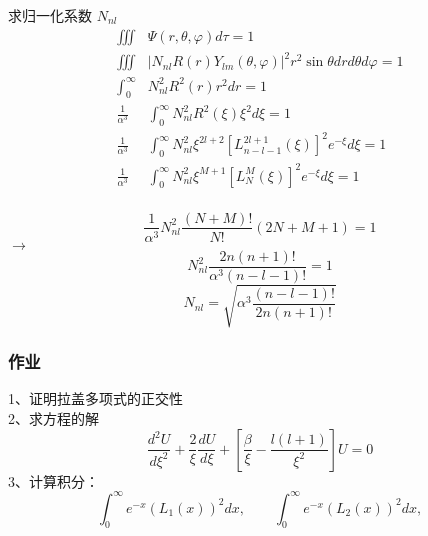 \begin{frame}
	求归一化系数 $N_{nl}$ 
	\begin{equation*}
	\begin{split}
		\iiint  &\Psi(r,\theta,\varphi) d \tau =1  \\
		\iiint  &|N_{nl} R (r) Y_{lm} (\theta,\varphi)| ^2 r^2 \sin \theta dr d\theta d\varphi =1  \\
		\int_{0}^{\infty}  & N^2_{nl} R^2  (r)  r^2 dr =1   \\
		\frac{1}{\alpha ^3}	&\int_{0}^{\infty}  N^2_{nl}  R^2 (\xi)  \xi^2 d\xi =1   \\
		\frac{1}{\alpha ^3} &	\int_{0}^{\infty}  N^2_{nl}  \xi ^{2l+2}  [L_{n-l-1} ^{2l+1} (\xi)]^2 e^{-\xi}  d\xi =1   \\
		\frac{1}{\alpha ^3} &	\int_{0}^{\infty}  N^2_{nl}  \xi ^{M+1}  [L_N ^M (\xi)]^2 e^{-\xi}  d\xi =1   \\
	\end{split}		
	\end{equation*}	
\end{frame}		

\begin{frame}
	\begin{equation*}
		\frac{1}{\alpha ^3} 	  N^2_{nl}  \frac{(N+M)!}{N!} (2N+M+1) =1  	
	\end{equation*}	
	$\to$ \\
	\begin{equation*}
		N^2 _{nl}  \frac{2n (n+1)!} {\alpha^3 (n-l-1)!} =1
	\end{equation*}	
	\begin{equation*}
		N_{nl}  =\sqrt{\alpha^3 \frac{ (n-l-1)!}{2n (n+1)!}} 
	\end{equation*}	
\end{frame}		

\begin{frame}
	\frametitle{作业}
	1、证明拉盖多项式的正交性\\
	2、求方程的解
	\begin{equation*}
		\frac{d^2 U}{d \xi ^2} + \frac{2}{\xi }\frac{d U }{d \xi}  +[\frac{\beta}{\xi} - \frac{l(l+1)}{\xi ^2}] U=0
	\end{equation*}	 
	3、计算积分：
	\begin{equation*}
		\int_{0}^{\infty}   e^{-x} ( L_1 (x) )^2 dx, \qquad  \int_{0}^{\infty}   e^{-x} ( L_2 (x) )^2 dx, 
	\end{equation*}	
\end{frame}		